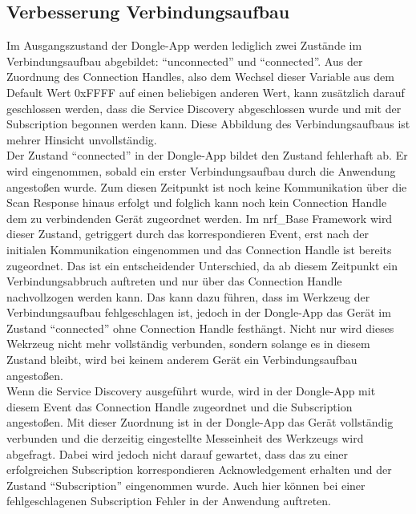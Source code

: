 \subsection{Verbesserung Verbindungsaufbau}
Im Ausgangszustand der Dongle-App werden lediglich zwei Zustände im Verbindungsaufbau abgebildet: ``unconnected'' und ``connected''. Aus der Zuordnung des Connection Handles, also dem Wechsel dieser Variable aus dem Default Wert 0xFFFF auf einen beliebigen anderen Wert, kann zusätzlich darauf geschlossen werden, dass die Service Discovery abgeschlossen wurde und mit der Subscription begonnen werden kann. Diese Abbildung des Verbindungsaufbaus ist mehrer Hinsicht unvollständig.\\
Der Zustand ``connected'' in der Dongle-App bildet den Zustand fehlerhaft ab. Er wird eingenommen, sobald ein erster Verbindungsaufbau durch die Anwendung angestoßen wurde. Zum diesen Zeitpunkt ist noch keine Kommunikation über die Scan Response hinaus erfolgt und folglich kann noch kein Connection Handle dem zu verbindenden Gerät zugeordnet werden. Im nrf\_Base Framework wird dieser Zustand, getriggert durch das korrespondieren Event, erst nach der initialen Kommunikation eingenommen und das Connection Handle ist bereits zugeordnet. Das ist ein entscheidender Unterschied, da ab diesem Zeitpunkt ein Verbindungsabbruch auftreten und nur über das Connection Handle nachvollzogen werden kann. Das kann dazu führen, dass im Werkzeug der Verbindungsaufbau fehlgeschlagen ist, jedoch in der Dongle-App das Gerät im Zustand ``connected'' ohne Connection Handle festhängt. Nicht nur wird dieses Wekrzeug nicht mehr vollständig verbunden, sondern solange es in diesem Zustand bleibt, wird bei keinem anderem Gerät ein Verbindungsaufbau angestoßen.\\
Wenn die Service Discovery ausgeführt wurde, wird in der Dongle-App mit diesem Event das Connection Handle zugeordnet und die Subscription angestoßen. Mit dieser Zuordnung ist in der Dongle-App das Gerät vollständig verbunden und die derzeitig eingestellte Messeinheit des Werkzeugs wird abgefragt. Dabei wird jedoch nicht darauf gewartet, dass das zu einer erfolgreichen Subscription korrespondieren Acknowledgement erhalten und der Zustand ``Subscription'' eingenommen wurde. Auch hier können bei einer fehlgeschlagenen Subscription Fehler in der Anwendung auftreten.\\
